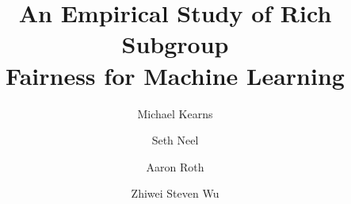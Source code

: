 \documentclass[9pt]{article}
\theoremstyle{definition}
\begin{document}
\title{An Empirical Study of Rich Subgroup\\ Fairness for Machine Learning}


\author[1]{Michael Kearns}
\author[1]{Seth Neel}
\author[1]{Aaron Roth}
\author[2]{Zhiwei Steven Wu}







\maketitle
\end{document}
